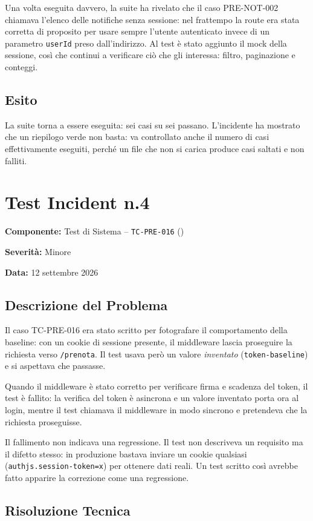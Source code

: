 \documentclass[11pt,a4paper,oneside,openany]{book}
\newcommand{\datiincidente}[3]{%
  \textbf{Componente:} #1\par
  \textbf{Severità:} #2\par
  \textbf{Data:} #3\par\medskip}
\begin{document}
Una volta eseguita davvero, la suite ha rivelato che il caso PRE-NOT-002
chiamava l'elenco delle notifiche senza sessione: nel frattempo la route era
stata corretta di proposito per usare sempre l'utente autenticato invece di
un parametro \texttt{userId} preso dall'indirizzo. Al test è stato aggiunto il
mock della sessione, così che continui a verificare ciò che gli interessa:
filtro, paginazione e conteggi.

\subsection{Esito}

La suite torna a essere eseguita: sei casi su sei passano. L'incidente ha
mostrato che un riepilogo verde non basta: va controllato anche il numero di
casi effettivamente eseguiti, perché un file che non si carica produce casi
saltati e non falliti.

\section{Test Incident n.4}

\datiincidente{Test di Sistema -- \texttt{TC-PRE-016}
(\file{tests/pre-modifica/admin-ui.test.ts})}{Minore}{12 settembre 2026}

\subsection{Descrizione del Problema}

Il caso TC-PRE-016 era stato scritto per fotografare il comportamento della
baseline: con un cookie di sessione presente, il middleware lascia proseguire
la richiesta verso \texttt{/prenota}. Il test usava però un valore
\emph{inventato} (\texttt{token-baseline}) e si aspettava che passasse.

Quando il middleware è stato corretto per verificare firma e scadenza del
token, il test è fallito: la verifica del token è asincrona e un valore
inventato porta ora al login, mentre il test chiamava il middleware in modo
sincrono e pretendeva che la richiesta proseguisse.

Il fallimento non indicava una regressione. Il test non descriveva un
requisito ma il difetto stesso: in produzione bastava inviare un cookie
qualsiasi (\texttt{authjs.session-token=x}) per ottenere dati reali. Un test
scritto così avrebbe fatto apparire la correzione come una regressione.

\subsection{Risoluzione Tecnica}
\end{document}
